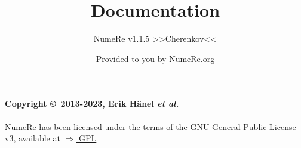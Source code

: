 \documentclass[DIV=17, parskip=half]{scrreprt}
\title{Documentation}
\subtitle{NumeRe v1.1.5 >>Cherenkov<<}
\date{}
\author{\small Provided to you by NumeRe.org}
\begin{document}
    \maketitle
% 
% 
	\tableofcontents
		\paragraph{Copyright \copyright\ 2013-2023, Erik H\"anel \emph{et al.}} 
		NumeRe has been licensed under the terms of the GNU General Public License v3, available at \href{http://www.gnu.org/licenses/gpl.html}{$\Rightarrow$ GPL}
\end{document}
